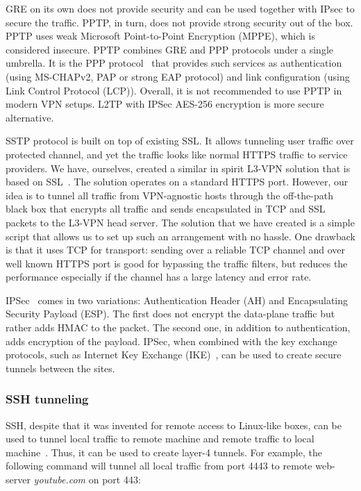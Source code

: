 GRE on its own does not provide security and can be used together with IPsec to secure 
the traffic. PPTP, in turn, does not provide strong security out of the box. PPTP uses 
weak Microsoft Point-to-Point Encryption (MPPE), which is considered insecure. PPTP combines 
GRE and PPP protocols under a single umbrella. It is the PPP protocol~\cite{tcpip}
that provides such services as authentication (using MS-CHAPv2, PAP or strong EAP protocol) 
and link configuration (\ie using Link Control Protocol (LCP)). Overall, it is not recommended
to use PPTP in modern VPN setups. L2TP with IPSec AES-256 encryption is more secure alternative.

SSTP protocol is built on top of existing SSL. It allows tunneling user traffic over protected 
channel, and yet the traffic looks like normal HTTPS traffic to service providers.
We have, ourselves, created a similar in spirit L3-VPN solution that is based on SSL~\cite{ssl:vpn}.
The solution operates on a standard HTTPS port. However, our idea is to tunnel 
all traffic from VPN-agnostic hosts through the off-the-path black box that encrypts 
all traffic and sends encapsulated in TCP and SSL
packets to the L3-VPN head server. The solution that we have created is a simple script 
that allows us to set up such an arrangement with no hassle. One drawback is that it 
uses TCP for transport: sending over a reliable TCP channel and over well known HTTPS port
is good for bypassing the traffic filters, but reduces the performance especially if
the channel has a large latency and error rate. 

IPSec~\cite{tcpip} comes in two variations: Authentication Header (AH) and Encapsulating Security Payload (ESP).
The first does not encrypt the data-plane traffic but rather adds HMAC to the packet. The second one, in
addition to authentication, adds encryption of the payload. IPSec, when combined with the key exchange 
protocols, such as Internet Key Exchange (IKE)~\cite{rfc4306}, can be used to create secure tunnels between the sites.

\subsubsection{SSH tunneling}

SSH, despite that it was invented for remote access to Linux-like boxes, can be used 
to tunnel local traffic to remote machine and remote traffic to local machine~\cite{ssh:tunneling}. Thus, it can be used to create
layer-4 tunnels. For example, the following command will tunnel all local traffic from
port 4443 to remote web-server {\it youtube.com} on port 443:

